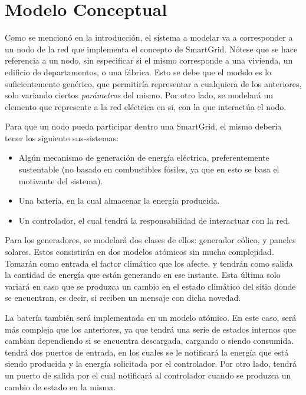 \section{Modelo Conceptual} \label{section:modeloConceptual}

Como se mencionó en la introducción, el sistema a modelar va a corresponder a
un nodo de la red que implementa el concepto de SmartGrid. Nótese que se hace
referencia a un nodo, sin especificar si el mismo corresponde a una vivienda,
un edificio de departamentos, o una fábrica. Esto se debe que el modelo es lo
suficientemente genérico, que permitiría representar a cualquiera de los
anteriores, solo variando ciertos \textit{parámetros} del mismo. Por otro
lado, se modelará un elemento que represente a la red eléctrica en si, con la
que interactúa el nodo.

Para que un nodo pueda participar dentro una SmartGrid, el mismo debería
tener los siguiente sus-sistemas:
\begin{itemize}
    \item Algún mecanismo de generación de energía eléctrica, preferentemente
    sustentable (no basado en combustibles fósiles, ya que en esto se basa el
    motivante del sistema).
    \item Una batería, en la cual almacenar la energía producida.
    \item Un controlador, el cual tendrá la responsabilidad de interactuar con la red.
\end{itemize}

Para los generadores, se modelará dos clases de ellos: generador eólico, y
paneles solares. Estos consistirán en dos modelos atómicos sin mucha
complejidad. Tomarán como entrada el factor climático que los afecte, y
tendrán como salida la cantidad de energía que están generando en ese
instante. Esta última solo variará en caso que se produzca un cambio en el
estado climático del sitio donde se encuentran, es decir, si reciben un
mensaje con dicha novedad.

La batería también será implementada en un modelo atómico. En este caso,
será más compleja que los anteriores, ya que tendrá una serie de estados
internos que cambian dependiendo si se encuentra descargada, cargando o
siendo consumida. tendrá dos puertos de entrada, en los cuales se le
notificará la energía que está siendo producida y la energía solicitada por
el controlador. Por otro lado, tendrá un puerto de salida por el cual
notificará al controlador cuando se produzca un cambio de estado en la misma.

